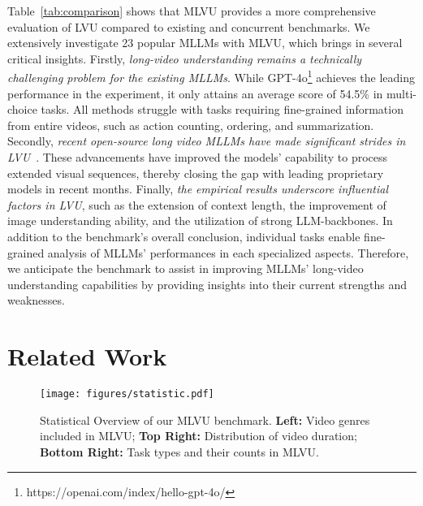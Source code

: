 Table~\ref{tab:comparison} shows that MLVU provides a more comprehensive evaluation of LVU compared to existing and concurrent benchmarks. We extensively investigate 23 popular MLLMs with MLVU, which brings in several critical insights. Firstly, \textit{long-video understanding remains a technically challenging problem for the existing MLLMs}. While GPT-4o\footnote{https://openai.com/index/hello-gpt-4o/} achieves the leading performance in the experiment, it only attains an average score of 54.5\% in multi-choice tasks. All methods struggle with tasks requiring fine-grained information from entire videos, such as action counting, ordering, and summarization. 
Secondly, \textit{recent open-source long video MLLMs have made significant strides in LVU}~\cite{zhang2024longva,fei2024videoccam,shu2024videoxl}. These advancements have improved the models' capability to process extended visual sequences, thereby closing the gap with leading proprietary models in recent months.
Finally, \textit{the empirical results underscore influential factors in LVU}, such as the extension of context length, the improvement of image understanding ability, and the utilization of strong LLM-backbones. In addition to the benchmark's overall conclusion, individual tasks enable fine-grained analysis of MLLMs' performances in each specialized aspects. Therefore, we anticipate the benchmark to assist in improving MLLMs' long-video understanding capabilities by providing insights into their current strengths and weaknesses. 

\vspace{-0.15cm}
\section{Related Work}
\vspace{-0.15cm}

\begin{figure*}[h!]
    \centering
    \vspace{-0.3cm}
    \texttt{[image: figures/statistic.pdf]}
    \vspace{-0.5cm}
    \caption{Statistical Overview of our MLVU benchmark. \textbf{Left:} Video genres included in MLVU; \textbf{Top Right:} Distribution of video duration; \textbf{Bottom Right:} Task types and their counts in MLVU.}    \label{fig:statistic}
    \vspace{-0.5cm}
\end{figure*}

